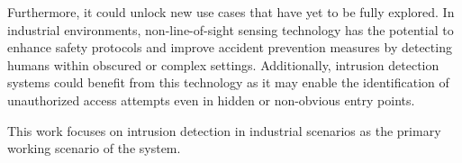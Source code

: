 	Furthermore, it could unlock new use cases that have yet to be fully explored. In industrial environments, non-line-of-sight sensing technology has the potential to enhance safety protocols and improve accident prevention measures by detecting humans within obscured or complex settings. Additionally, intrusion detection systems could benefit from this technology as it may enable the identification of unauthorized access attempts even in hidden or non-obvious entry points.
	
	This work focuses on intrusion detection in industrial scenarios as the primary working scenario of the system. 
	
	

